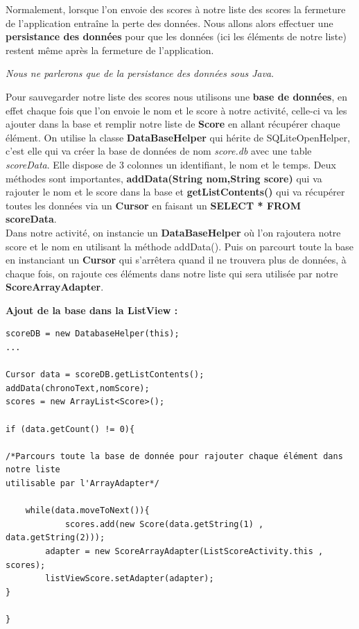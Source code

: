 \documentclass{article}
\begin{document}
Normalement,	 lorsque l'on envoie des scores à notre liste des scores la fermeture de l'application entraîne la perte des données. Nous allons alors effectuer une \textbf{persistance des données} pour que les données (ici les éléments de notre liste) restent même après la fermeture de l'application. 

\textit{Nous ne parlerons que de la persistance des données sous Java}. 



Pour sauvegarder notre liste des scores nous utilisons une \textbf{base de données}, en effet chaque fois que l'on envoie le nom et le score à notre activité, celle-ci va les ajouter dans la base et remplir notre liste de \textbf{Score} en allant récupérer chaque élément. 
On utilise la classe \textbf{DataBaseHelper} qui hérite de SQLiteOpenHelper, c'est elle qui va créer la base de données de nom \textit{score.db} avec une table \textit{scoreData}. Elle dispose de 3 colonnes un identifiant, le nom et le temps. Deux méthodes sont importantes, \textbf{addData(String nom,String score)} qui va rajouter le nom et le score dans la base et \textbf{getListContents()} qui va récupérer toutes les données via un \textbf{Cursor }en faisant un \textbf{SELECT * FROM scoreData}. 
\\
Dans notre activité, on instancie un \textbf{DataBaseHelper} où l'on rajoutera notre score et le nom en utilisant la méthode addData(). Puis on parcourt toute la base en instanciant un \textbf{Cursor} qui s'arrêtera quand il ne trouvera plus de données, à chaque fois, on rajoute ces éléments dans notre liste qui sera utilisée par notre \textbf{ScoreArrayAdapter}. 

\textbf{Ajout de la base dans la ListView : }

\begin{verbatim}
scoreDB = new DatabaseHelper(this);
...

Cursor data = scoreDB.getListContents();
addData(chronoText,nomScore);
scores = new ArrayList<Score>();

if (data.getCount() != 0){

/*Parcours toute la base de donnée pour rajouter chaque élément dans notre liste 
utilisable par l'ArrayAdapter*/

    while(data.moveToNext()){
    		scores.add(new Score(data.getString(1) , data.getString(2)));
        adapter = new ScoreArrayAdapter(ListScoreActivity.this , scores);
        listViewScore.setAdapter(adapter);
}

}
\end{verbatim}
\end{document}
